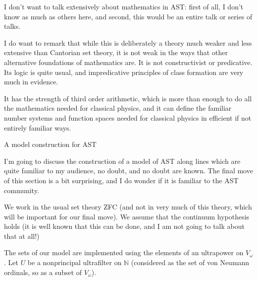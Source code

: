 \documentclass{slides}
\begin{document}
\begin{slide}

I don't want to talk extensively about mathematics in AST:  first of all, I don't know as much as others here, and second, this would be an entire talk or series of talks.

I do want to remark that while this is deliberately a theory much weaker and less extensive than Cantorian set theory, it is not weak in the ways that other alternative foundations of mathematics are.  It is not constructivist or predicative.  Its logic is quite usual, and impredicative principles of class formation are very much in evidence.

It has the strength of third order arithmetic, which is more than enough to do all the mathematics needed for classical physics, and it can define the familiar number systems and function spaces needed for classical physics in efficient if not entirely familiar ways.

\end{slide}

\begin{slide}

{\Large A model construction for AST}

I'm going to discuss the construction of a model of AST along lines which are quite familiar to my audience, no doubt, and no doubt are known.  The final move of this section is a bit surprising, and I do wonder if it is familiar to the AST community.

We work in the usual set theory ZFC (and not in very much of this theory, which will be important for our final move).
We assume that the continuum hypothesis holds (it is well known that this can be done, and I am not going to talk about that at all!)

The sets of our model are implemented using the elements of an ultrapower on $V_\omega$.  Let $U$ be a nonprincipal ultrafilter on $\mathbb N$ (considered as the set of von Neumann ordinals, so as a subset of $V_\omega$).

\end{slide}
\end{document}
